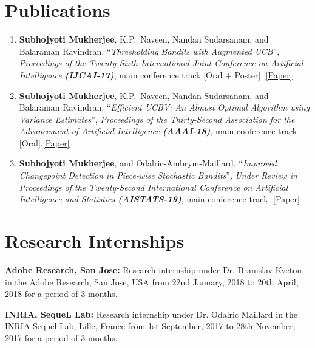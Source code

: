 \documentclass[margin,11pt]{res}
\begin{document}
\begin{resume}
\section{Publications}
\begin{enumerate}[leftmargin=*]
\item \textbf{Subhojyoti Mukherjee}, K.P.~Naveen, Nandan Sudarsanam, and Balaraman Ravindran, ``\textit{Thresholding Bandits with Augmented UCB}'', \textit{Proceedings of the Twenty-Sixth International Joint Conference on Artificial Intelligence \textbf{(IJCAI-17)}}, main conference track [Oral + Poster]. \href{https://www.ijcai.org/proceedings/2017/0350.pdf}{[Paper]}
\item \textbf{Subhojyoti Mukherjee}, K.P.~Naveen, Nandan Sudarsanam, and Balaraman Ravindran, ``\textit{Efficient UCBV: An Almost Optimal Algorithm using Variance Estimates}'', \textit{Proceedings of the Thirty-Second Association for the Advancement of Artificial Intelligence \textbf{(AAAI-18)}}, main conference track [Oral].\href{https://www.aaai.org/ocs/index.php/AAAI/AAAI18/paper/view/16111}{[Paper]}
\item \textbf{Subhojyoti Mukherjee}, and Odalric-Ambrym-Maillard, ``\textit{Improved Changepoint Detection in Piece-wise Stochastic Bandits}'', \textit{Under Review in Proceedings of the Twenty-Second International  Conference on Artificial Intelligence and Statistics  \textbf{(AISTATS-19)}}, main conference track. \href{https://subhojyoti.github.io/pdf/aistats_2019.pdf}{[Paper]}
\end{enumerate}


\section{Research Internships}
\textbf{Adobe Research, San Jose:} Research internship under Dr. Branislav Kveton in the Adobe Research, San Jose, USA from 22nd January, 2018 to 20th April, 2018 for a period of 3 months.

\textbf{INRIA, SequeL Lab:} Research internship under Dr. Odalric Maillard in the INRIA Sequel Lab, Lille, France from 1st September, 2017 to 28th November, 2017 for a period of 3 months.



\end{resume}
\end{document}
